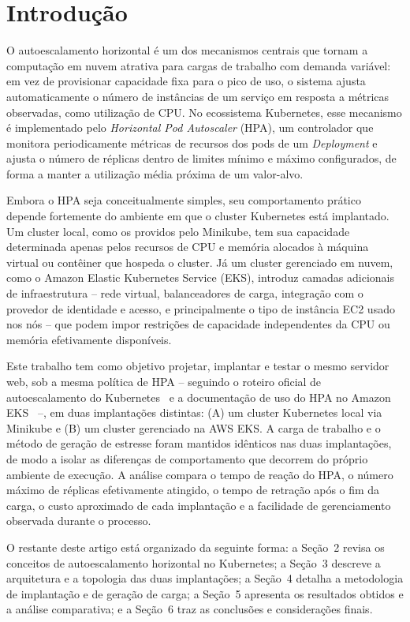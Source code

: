 \documentclass[12pt]{article}
\begin{document}
\section{Introdução}

O autoescalamento horizontal é um dos mecanismos centrais que tornam a
computação em nuvem atrativa para cargas de trabalho com demanda variável:
em vez de provisionar capacidade fixa para o pico de uso, o sistema ajusta
automaticamente o número de instâncias de um serviço em resposta a métricas
observadas, como utilização de CPU. No ecossistema Kubernetes, esse
mecanismo é implementado pelo \emph{Horizontal Pod Autoscaler} (HPA), um
controlador que monitora periodicamente métricas de recursos dos pods de um
\emph{Deployment} e ajusta o número de réplicas dentro de limites mínimo e
máximo configurados, de forma a manter a utilização média próxima de um
valor-alvo.

Embora o HPA seja conceitualmente simples, seu comportamento prático depende
fortemente do ambiente em que o cluster Kubernetes está implantado. Um
cluster local, como os providos pelo Minikube, tem sua capacidade
determinada apenas pelos recursos de CPU e memória alocados à máquina
virtual ou contêiner que hospeda o cluster. Já um cluster gerenciado em
nuvem, como o Amazon Elastic Kubernetes Service (EKS), introduz camadas
adicionais de infraestrutura -- rede virtual, balanceadores de carga,
integração com o provedor de identidade e acesso, e principalmente o tipo de
instância EC2 usado nos nós -- que podem impor restrições de capacidade
independentes da CPU ou memória efetivamente disponíveis.

Este trabalho tem como objetivo projetar, implantar e testar o mesmo
servidor web, sob a mesma política de HPA -- seguindo o roteiro oficial de
autoescalamento do Kubernetes~\cite{k8s-hpa-walkthrough} e a documentação de
uso do HPA no Amazon EKS~\cite{aws-eks-hpa} --, em duas implantações
distintas:
(A) um cluster Kubernetes local via Minikube e (B) um cluster gerenciado na
AWS EKS. A carga de trabalho e o método de geração de estresse foram
mantidos idênticos nas duas implantações, de modo a isolar as diferenças de
comportamento que decorrem do próprio ambiente de execução. A análise
compara o tempo de reação do HPA, o número máximo de réplicas efetivamente
atingido, o tempo de retração após o fim da carga, o custo aproximado de
cada implantação e a facilidade de gerenciamento observada durante o
processo.

O restante deste artigo está organizado da seguinte forma: a Seção~2 revisa
os conceitos de autoescalamento horizontal no Kubernetes; a Seção~3 descreve
a arquitetura e a topologia das duas implantações; a Seção~4 detalha a
metodologia de implantação e de geração de carga; a Seção~5 apresenta os
resultados obtidos e a análise comparativa; e a Seção~6 traz as conclusões e
considerações finais.
\end{document}
